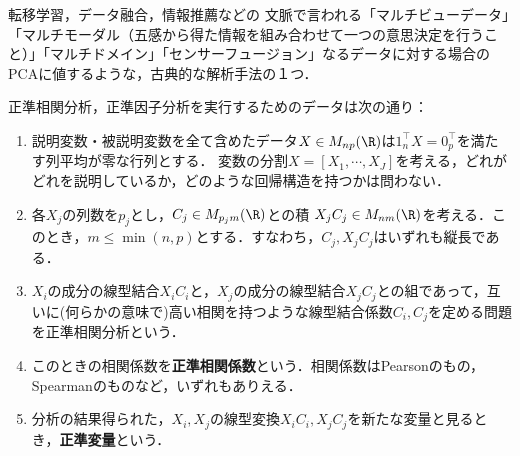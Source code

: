 \documentclass[uplatex,dvipdfmx]{jsreport}
\begin{document}
\begin{tcolorbox}[colframe=ForestGreen, colback=ForestGreen!10!white,breakable,colbacktitle=ForestGreen!40!white,coltitle=black,fonttitle=\bfseries\sffamily,
title=]
    転移学習，データ融合，情報推薦などの
    文脈で言われる「マルチビューデータ」「マルチモーダル（五感から得た情報を組み合わせて一つの意思決定を行うこと）」「マルチドメイン」「センサーフュージョン」なるデータに対する場合のPCAに値するような，古典的な解析手法の１つ．
\end{tcolorbox}

\begin{problem}[変数要約の問題]
    正準相関分析，正準因子分析を実行するためのデータは次の通り：
    \begin{enumerate}
        \item 説明変数・被説明変数を全て含めたデータ$X\in M_{np}(\R)$は$1_n^\top X=0_p^\top$を満たす列平均が零な行列とする．
        変数の分割$X=[X_1,\cdots,X_J]$を考える，どれがどれを説明しているか，どのような回帰構造を持つかは問わない．
        \item 各$X_j$の列数を$p_j$とし，$C_j\in M_{p_jm}(\R)$との積
        $X_jC_j\in M_{nm}(\R)$を考える．このとき，$m\le\min(n,p)$とする．すなわち，$C_j,X_jC_j$はいずれも縦長である．
        \item $X_i$の成分の線型結合$X_iC_i$と，$X_j$の成分の線型結合$X_jC_j$との組であって，互いに(何らかの意味で)高い相関を持つような線型結合係数$C_i,C_j$を定める問題を正準相関分析という．
        \item このときの相関係数を\textbf{正準相関係数}という．相関係数はPearsonのもの，Spearmanのものなど，いずれもありえる．
        \item 分析の結果得られた，$X_i,X_j$の線型変換$X_iC_i,X_jC_j$を新たな変量と見るとき，\textbf{正準変量}という．
    \end{enumerate}
\end{problem}
\end{document}
